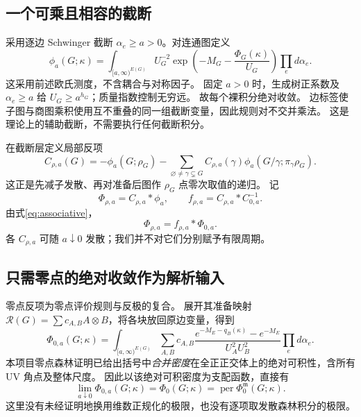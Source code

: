 \documentclass[11pt,a4paper]{ctexart}
\theoremstyle{cnplain}
\theoremstyle{remark}\newtheorem{remark}[theorem]{注}
\newcommand{\per}{\operatorname{per}}
\begin{document}
\subsection{一个可乘且相容的截断}
采用逐边 Schwinger 截断 $\alpha_e\geq a>0$。对连通图定义
\begin{equation}\label{eq:cutoff}
 \phi_a(G;\kappa)=\int_{[a,\infty)^{E(G)}}
    U_G^{-2}\exp\left(-M_G-\frac{\Phi_G(\kappa)}{U_G}\right)
                                  \prod_e d\alpha_e.
\end{equation}
这采用前述欧氏测度，不含耦合与对称因子。
固定 $a>0$ 时，生成树正系数及 $\alpha_e\geq a$ 给 $U_G\geq a^{h_G}$；质量指数控制无穷远。
故每个裸积分绝对收敛。
边标签使子图与商图乘积使用互不重叠的同一组截断变量，因此规则对不交并乘法。
这是理论上的辅助截断，不需要执行任何截断积分。

在截断层定义局部反项
\begin{equation}\label{eq:counterterm}
 C_{\rho,a}(G)=-\phi_a(G;\rho_G)
  -\sum_{\varnothing\ne\gamma\subsetneq G}
       C_{\rho,a}(\gamma)\phi_a(G/\gamma;\pi_\gamma\rho_G).
\end{equation}
这正是先减子发散、再对准备后图作 $\rho_G$ 点零次取值的递归。
记
\begin{equation}\label{eq:regulated}
 \Phi_{\rho,a}=C_{\rho,a}*\phi_a,
 \qquad f_{\rho,a}=C_{\rho,a}*C_{0,a}^{-1}.
\end{equation}
由式\eqref{eq:associative}，
\begin{equation}\label{eq:regulatedaction}
 \Phi_{\rho,a}=f_{\rho,a}*\Phi_{0,a}.
\end{equation}
各 $C_{\rho,a}$ 可随 $a\downarrow0$ 发散；我们并不对它们分别赋予有限周期。

\subsection{只需零点的绝对收敛作为解析输入}
零点反项为零点评价规则与反极的复合。
展开其准备映射 $\mathcal R(G)=\sum c_{A,B}A\otimes B$，将各块放回原边变量，得到
\begin{equation}\label{eq:zerodensity}
 \Phi_{0,a}(G;\kappa)=
 \int_{[a,\infty)^{E(G)}}
 \sum_{A,B}c_{A,B}
 \frac{e^{-M_E-q_B(\kappa)}-e^{-M_E}}{U_A^2U_B^2}
                                  \prod_e d\alpha_e.
\end{equation}
本项目零点森林证明已给出括号中\emph{合并密度}在全正正交体上的绝对可积性，含所有 UV 角点及整体尺度。
因此以该绝对可积密度为支配函数，直接有
\begin{equation}\label{eq:zerolimit}
 \lim_{a\downarrow0}\Phi_{0,a}(G;\kappa)
              =\Phi_0(G;\kappa)=\per\Phi_0^{\mathfrak m}(G;\kappa).
\end{equation}
这里没有未经证明地换用维数正规化的极限，也没有逐项取发散森林积分的极限。
\end{document}
